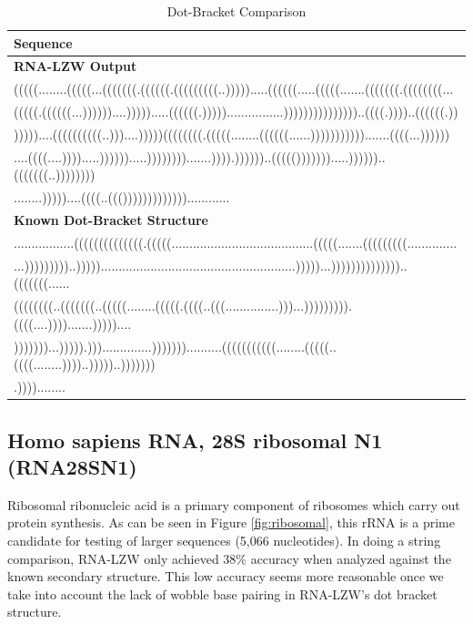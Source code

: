 \documentclass[sigconf]{acmart}
\begin{document}
\begin{table}
  \caption{Dot-Bracket Comparison}
  \label{tab:telomerase}
  \begin{tabular}{l}
    \textbf{Sequence}\\
    \midrule
    \textbf{RNA-LZW Output}\\
    (((((........(((((...(((((((.((((((.(((((((((..))))).....((((((.....(((((.......(((((((.((((((((...\\
    (((((.((((((...))))))....))))).....((((((.)))))................)))))))))))))))..((((.))))..((((((.))\\
    )))))....((((((((((..)))....)))))((((((((.(((((........((((((......))))))))))).......((((...))))))\\
    ....((((....)))).....)))))).....)))))))).......)))).))))))..((((())))))).....))))))..(((((((..))))))))\\
    ........)))))....((((..((()))))))))))))............\\
    \midrule 
    \textbf{Known Dot-Bracket Structure}\\
    .................((((((((((((((.(((((........................................(((((.......(((((((((..............\\
    ...)))))))))..))))).......................................................)))))...))))))))))))))..(((((((......\\
    ((((((((..(((((((..(((((........(((((.((((..(((...............)))...))))))))).((((....)))).......)))))....\\
    )))))))...))))).)))..............)))))))..........(((((((((((........(((((..((((........))))..)))))..)))))))\\
    .))))........
\end{tabular}
\end{table}

\subsection{Homo sapiens RNA, 28S ribosomal N1 (RNA28SN1)}

Ribosomal ribonucleic acid is a primary component of ribosomes which carry out protein synthesis.  As can be seen in Figure \ref{fig:ribosomal},  this rRNA is a prime candidate for testing of larger sequences (5,066 nucleotides). 
In doing a string comparison, RNA-LZW only achieved 38\% accuracy when analyzed against the known secondary structure.  This low accuracy seems more reasonable once we take into account the lack of wobble base pairing in RNA-LZW's dot bracket structure.  
\end{document}
